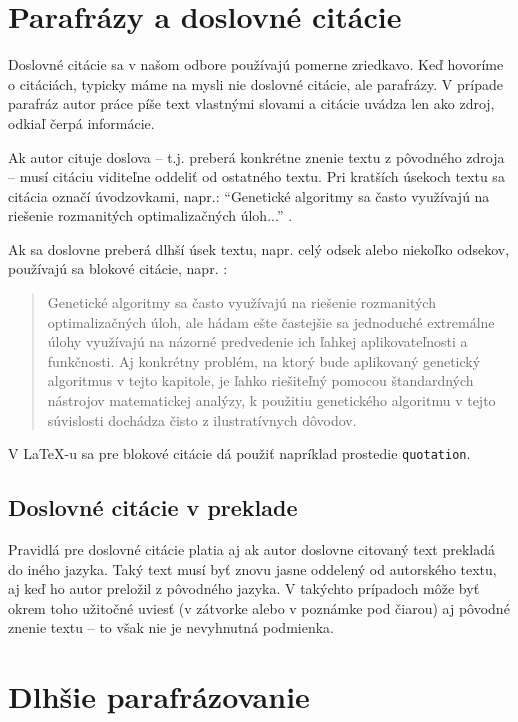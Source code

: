\section{Parafrázy a doslovné citácie}

Doslovné citácie sa v našom odbore používajú pomerne zriedkavo. Keď hovoríme o citáciách, typicky máme na mysli nie doslovné citácie, ale parafrázy. V prípade parafráz autor práce píše text vlastnými slovami a citácie uvádza len ako zdroj, odkiaľ čerpá informácie.

Ak autor cituje doslova -- t.j. preberá konkrétne znenie textu z pôvodného zdroja -- musí citáciu viditeľne oddeliť od ostatného textu. Pri kratších úsekoch textu sa citácia označí úvodzovkami, napr.: \enquote{Genetické algoritmy sa často využívajú na riešenie rozmanitých optimalizačných úloh...} \cite{Hynek2008}.

Ak sa doslovne preberá dlhší úsek textu, napr. celý odsek alebo niekoľko odsekov, používajú sa blokové citácie, napr. \cite{Hynek2008}:
\begin{quotation}
Genetické algoritmy sa často využívajú na riešenie rozmanitých optimalizačných úloh, ale hádam ešte častejšie sa jednoduché extremálne úlohy využívajú na názorné predvedenie ich ľahkej aplikovateľnosti a funkčnosti. Aj konkrétny problém, na ktorý bude aplikovaný genetický algoritmus v tejto kapitole, je ľahko riešiteľný pomocou štandardných nástrojov matematickej analýzy, k použitiu genetického algoritmu v tejto súvislosti dochádza čisto z ilustratívnych dôvodov.
\end{quotation}
V LaTeX-u sa pre blokové citácie dá použiť napríklad prostedie \texttt{quotation}.

\subsection{Doslovné citácie v preklade}

Pravidlá pre doslovné citácie platia aj ak autor doslovne citovaný text prekladá do iného jazyka. Taký text musí byť znovu jasne oddelený od autorského textu, aj keď ho autor preložil z pôvodného jazyka. V takýchto prípadoch môže byť okrem toho užitočné uviesť (v zátvorke alebo v poznámke pod čiarou) aj pôvodné znenie textu -- to však nie je nevyhnutná podmienka.

\section{Dlhšie parafrázovanie}


